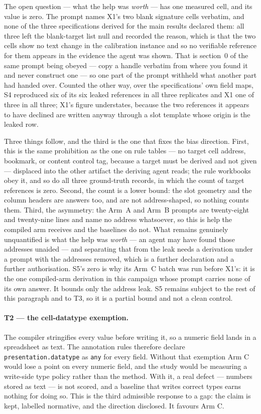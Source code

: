 The open question --- what the help was \emph{worth} --- has one measured cell, and its value
is zero. The prompt names X1's two blank signature cells verbatim, and none of the three
specifications derived for the main results declared them: all three left the blank-target list
null and recorded the reason, which is that the two cells show no text change in the calibration
instance and so no verifiable reference for them appears in the evidence the agent was shown.
That is section~0 of the same prompt being obeyed --- copy a handle verbatim from where you
found it and never construct one --- so one part of the prompt withheld what another part had
handed over. Counted the other way, over the specifications' own field maps, S4 reproduced six
of its six leaked references in all three replicates and X1 one of three in all three; X1's
figure understates, because the two references it appears to have declined are written anyway
through a slot template whose origin is the leaked row.

Three things follow, and the third is the one that fixes the bias direction. First, this is the
same prohibition as the one on rule tables --- no target cell address, bookmark, or content
control tag, because a target must be derived and not given --- displaced into the other
artifact the deriving agent reads; the rule workbooks obey it, and so do all three ground-truth
records, in which the count of target references is zero. Second, the count is a lower bound:
the slot geometry and the column headers are answers too, and are not address-shaped, so nothing
counts them. Third, the asymmetry: the Arm~A and Arm~B prompts are twenty-eight and twenty-nine
lines and name no address whatsoever, so this is help the compiled arm receives and the baselines
do not. What remains genuinely unquantified is what the help was \emph{worth} --- an agent may
have found those addresses unaided --- and separating that from the leak needs a derivation under
a prompt with the addresses removed, which is a further declaration and a further authorisation.
S5's zero is why its Arm~C batch was run before X1's: it is the one compiled-arm derivation in
this campaign whose prompt carries none of its own answer. It bounds only the address leak. S5
remains subject to the rest of this paragraph and to T3, so it is a partial bound and not a clean
control.

\paragraph{T2 --- the cell-datatype exemption.}
The compiler stringifies every value before writing it, so a numeric field lands in a
spreadsheet as text. The annotation rules therefore declare \texttt{presentation.datatype} as
\texttt{any} for every field. Without that exemption Arm C would lose a point on every numeric
field, and the study would be measuring a write-side type policy rather than the method. With
it, a real defect --- numbers stored as text --- is not scored, and a baseline that writes
correct types earns nothing for doing so. This is the third admissible response to a gap: the
claim is kept, labelled normative, and the direction disclosed. It favours Arm C.

